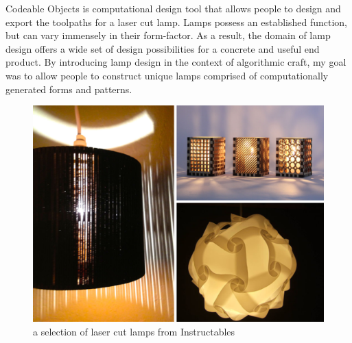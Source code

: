 Codeable Objects is computational design tool that allows people to design and export the toolpaths for a laser cut lamp. Lamps possess an established function, but can vary immensely in their form-factor.  As a result, the domain of lamp design offers a wide set of design possibilities for a concrete and useful end product. By introducing lamp design in the context of algorithmic craft, my goal was to allow people to construct unique lamps comprised of computationally generated forms and patterns. 
\begin{center}
\begin{figure}[h!]
\includegraphics[width=\columnwidth]{images/instructables_lamps.png}
\caption{a selection of laser cut lamps from Instructables}
\end{figure}
\end{center}
